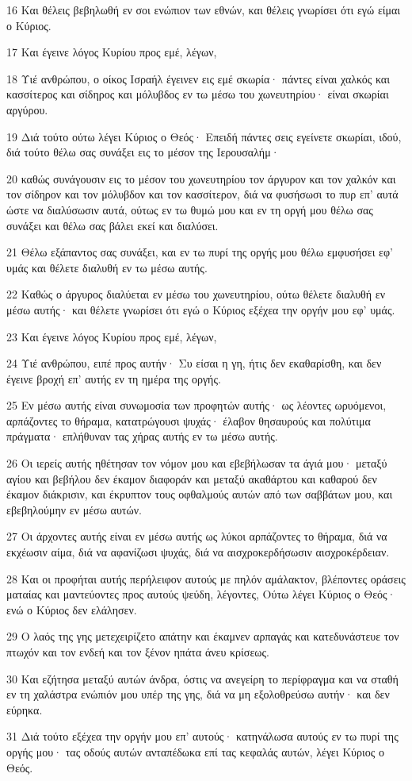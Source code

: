 \par 16 Και θέλεις βεβηλωθή εν σοι ενώπιον των εθνών, και θέλεις γνωρίσει ότι εγώ είμαι ο Κύριος.
\par 17 Και έγεινε λόγος Κυρίου προς εμέ, λέγων,
\par 18 Υιέ ανθρώπου, ο οίκος Ισραήλ έγεινεν εις εμέ σκωρία· πάντες είναι χαλκός και κασσίτερος και σίδηρος και μόλυβδος εν τω μέσω του χωνευτηρίου· είναι σκωρίαι αργύρου.
\par 19 Διά τούτο ούτω λέγει Κύριος ο Θεός· Επειδή πάντες σεις εγείνετε σκωρίαι, ιδού, διά τούτο θέλω σας συνάξει εις το μέσον της Ιερουσαλήμ·
\par 20 καθώς συνάγουσιν εις το μέσον του χωνευτηρίου τον άργυρον και τον χαλκόν και τον σίδηρον και τον μόλυβδον και τον κασσίτερον, διά να φυσήσωσι το πυρ επ' αυτά ώστε να διαλύσωσιν αυτά, ούτως εν τω θυμώ μου και εν τη οργή μου θέλω σας συνάξει και θέλω σας βάλει εκεί και διαλύσει.
\par 21 Θέλω εξάπαντος σας συνάξει, και εν τω πυρί της οργής μου θέλω εμφυσήσει εφ' υμάς και θέλετε διαλυθή εν τω μέσω αυτής.
\par 22 Καθώς ο άργυρος διαλύεται εν μέσω του χωνευτηρίου, ούτω θέλετε διαλυθή εν μέσω αυτής· και θέλετε γνωρίσει ότι εγώ ο Κύριος εξέχεα την οργήν μου εφ' υμάς.
\par 23 Και έγεινε λόγος Κυρίου προς εμέ, λέγων,
\par 24 Υιέ ανθρώπου, ειπέ προς αυτήν· Συ είσαι η γη, ήτις δεν εκαθαρίσθη, και δεν έγεινε βροχή επ' αυτής εν τη ημέρα της οργής.
\par 25 Εν μέσω αυτής είναι συνωμοσία των προφητών αυτής· ως λέοντες ωρυόμενοι, αρπάζοντες το θήραμα, κατατρώγουσι ψυχάς· έλαβον θησαυρούς και πολύτιμα πράγματα· επλήθυναν τας χήρας αυτής εν τω μέσω αυτής.
\par 26 Οι ιερείς αυτής ηθέτησαν τον νόμον μου και εβεβήλωσαν τα άγιά μου· μεταξύ αγίου και βεβήλου δεν έκαμον διαφοράν και μεταξύ ακαθάρτου και καθαρού δεν έκαμον διάκρισιν, και έκρυπτον τους οφθαλμούς αυτών από των σαββάτων μου, και εβεβηλούμην εν μέσω αυτών.
\par 27 Οι άρχοντες αυτής είναι εν μέσω αυτής ως λύκοι αρπάζοντες το θήραμα, διά να εκχέωσιν αίμα, διά να αφανίζωσι ψυχάς, διά να αισχροκερδήσωσιν αισχροκέρδειαν.
\par 28 Και οι προφήται αυτής περήλειφον αυτούς με πηλόν αμάλακτον, βλέποντες οράσεις ματαίας και μαντεύοντες προς αυτούς ψεύδη, λέγοντες, Ούτω λέγει Κύριος ο Θεός· ενώ ο Κύριος δεν ελάλησεν.
\par 29 Ο λαός της γης μετεχειρίζετο απάτην και έκαμνεν αρπαγάς και κατεδυνάστευε τον πτωχόν και τον ενδεή και τον ξένον ηπάτα άνευ κρίσεως.
\par 30 Και εζήτησα μεταξύ αυτών άνδρα, όστις να ανεγείρη το περίφραγμα και να σταθή εν τη χαλάστρα ενώπιόν μου υπέρ της γης, διά να μη εξολοθρεύσω αυτήν· και δεν εύρηκα.
\par 31 Διά τούτο εξέχεα την οργήν μου επ' αυτούς· κατηνάλωσα αυτούς εν τω πυρί της οργής μου· τας οδούς αυτών ανταπέδωκα επί τας κεφαλάς αυτών, λέγει Κύριος ο Θεός.

